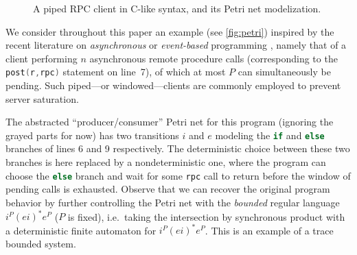 \documentclass[11pt,reqno,a4paper]{amsart}
\newcommand{\cpp}{\lstinline[language=C++]}
\theoremstyle{plain}
\theoremstyle{definition}
\theoremstyle{remark}
\begin{document}
\begin{figure}[t]
\begin{minipage}{\textwidth}
\end{minipage}\vspace{-1em}
\caption{\label{fig:petri}A piped RPC client in C-like syntax, and its Petri net modelization.}
\end{figure}

\lstset{basicstyle=\small}
We consider throughout this paper an example (see \autoref{fig:petri})
inspired by the recent literature on \emph{asynchronous} or
\emph{event-based} programming \citep{tame,liveasynch}, namely that of
a client performing $n$ asynchronous remote procedure calls
(corresponding to the \cpp{post(r,rpc)} statement on line~7), of which
at most $P$ can simultaneously be pending.  Such piped---or
windowed---clients are commonly employed to prevent server
saturation.

The abstracted ``producer/consumer'' Petri net for this program
(ignoring the grayed parts for now) has two transitions $i$ and $e$
modeling the \cpp{if} and \cpp{else} branches of lines 6 and 9
respectively.  The deterministic choice between these two branches is
here replaced by a nondeterministic one, where the program can choose
the \cpp{else} branch and wait for some \cpp{rpc} call to return
before the window of pending calls is exhausted.  Observe that we can
recover the original program behavior by further controlling the Petri
net with the \emph{bounded} regular language $i^P(ei)^\ast e^P$ ($P$
is fixed), i.e.\ taking the intersection by synchronous product with a
deterministic finite automaton for $i^P(ei)^\ast e^P$.  
This is an example of a trace bounded system. 
\end{document}
